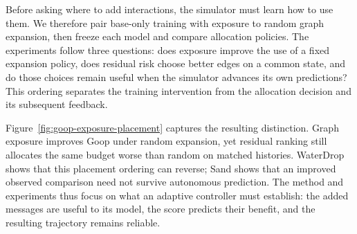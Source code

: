 Before asking where to add interactions, the simulator must learn how to use them. We therefore pair base-only training with exposure to random graph expansion, then freeze each model and compare allocation policies. The experiments follow three questions: does exposure improve the use of a fixed expansion policy, does residual risk choose better edges on a common state, and do those choices remain useful when the simulator advances its own predictions? This ordering separates the training intervention from the allocation decision and its subsequent feedback.

Figure~\ref{fig:goop-exposure-placement} captures the resulting distinction. Graph exposure improves Goop under random expansion, yet residual ranking still allocates the same budget worse than random on matched histories. WaterDrop shows that this placement ordering can reverse; Sand shows that an improved observed comparison need not survive autonomous prediction. The method and experiments thus focus on what an adaptive controller must establish: the added messages are useful to its model, the score predicts their benefit, and the resulting trajectory remains reliable.
